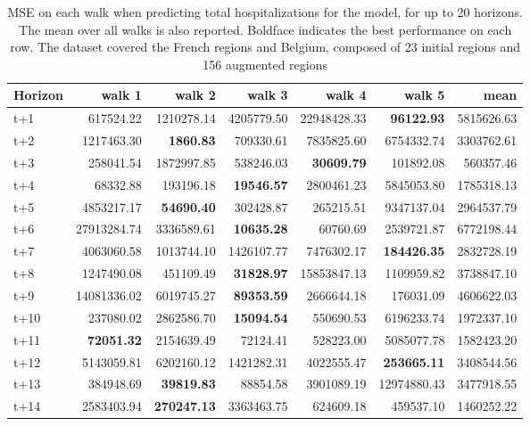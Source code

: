\begin{table}[H]
\centering
\caption{MSE on each walk when predicting total hospitalizations for the model, for up to 20 horizons. The mean over all walks is also reported. Boldface indicates the best performance on each row. The dataset covered the French regions and Belgium, composed of 23 initial regions and 156 augmented regions }
\label{tab:MSE_walk_dense_model}
\begin{tabular}{lrrrrrr}
\toprule
Horizon &      walk 1 &     walk 2 &     walk 3 &      walk 4 &      walk 5 &       mean \\
\midrule
t+1  & 617524.22  & 1210278.14  & 4205779.50  & 22948428.33  & \textbf{96122.93}  & 5815626.63  \\
t+2  & 1217463.30  & \textbf{1860.83}  & 709330.61  & 7835825.60  & 6754332.74  & 3303762.61  \\
t+3  & 258041.54  & 1872997.85  & 538246.03  & \textbf{30609.79}  & 101892.08  & 560357.46  \\
t+4  & 68332.88  & 193196.18  & \textbf{19546.57}  & 2800461.23  & 5845053.80  & 1785318.13  \\
t+5  & 4853217.17  & \textbf{54690.40}  & 302428.87  & 265215.51  & 9347137.04  & 2964537.79  \\
t+6  & 27913284.74  & 3336589.61  & \textbf{10635.28}  & 60760.69  & 2539721.87  & 6772198.44  \\
t+7  & 4063060.58  & 1013744.10  & 1426107.77  & 7476302.17  & \textbf{184426.35}  & 2832728.19  \\
t+8  & 1247490.08  & 451109.49  & \textbf{31828.97}  & 15853847.13  & 1109959.82  & 3738847.10  \\
t+9  & 14081336.02  & 6019745.27  & \textbf{89353.59}  & 2666644.18  & 176031.09  & 4606622.03  \\
t+10  & 237080.02  & 2862586.70  & \textbf{15094.54}  & 550690.53  & 6196233.74  & 1972337.10  \\
t+11  & \textbf{72051.32}  & 2154639.49  & 72124.41  & 528223.00  & 5085077.78  & 1582423.20  \\
t+12  & 5143059.81  & 6202160.12  & 1421282.31  & 4022555.47  & \textbf{253665.11}  & 3408544.56  \\
t+13  & 384948.69  & \textbf{39819.83}  & 88854.58  & 3901089.19  & 12974880.43  & 3477918.55  \\
t+14  & 2583403.94  & \textbf{270247.13}  & 3363463.75  & 624609.18  & 459537.10  & 1460252.22  \\

\end{tabular}
\end{table}
